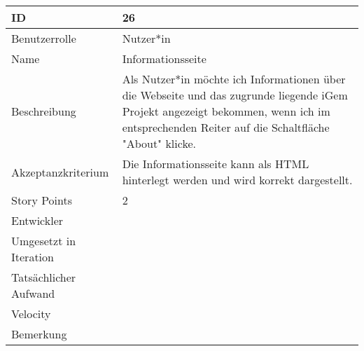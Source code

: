 \begin{tabularx}{\textwidth}{|p{}|X|}
	\hline
	ID & 26\\
	\hline
	Benutzerrolle & Nutzer*in\\
	\hline
	Name & Informationsseite\\
	\hline
	Beschreibung & Als Nutzer*in möchte ich Informationen über die Webseite und das zugrunde liegende iGem Projekt angezeigt bekommen, wenn ich im entsprechenden Reiter auf die Schaltfläche "About" klicke.\\
	\hline
	Akzeptanzkriterium & Die Informationsseite kann als HTML hinterlegt werden und wird korrekt dargestellt.\\
	\hline
	Story Points & 2\\
	\hline
	Entwickler & \\
	\hline
	Umgesetzt in Iteration & \\ 
	\hline
	Tatsächlicher Aufwand & \\
	\hline
	Velocity & \\
	\hline
	Bemerkung & \\
	\hline
\end{tabularx}
\vspace{20pt}
